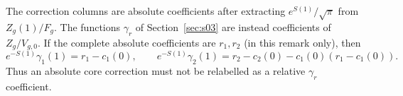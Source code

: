 \begin{rmk}[Normalization]
The correction columns are absolute coefficients after extracting
$e^{S(1)}/\sqrt\pi$ from $Z_g(1)/F_g$. The functions $\gamma_r$ of
Section~\ref{sec:s03} are instead coefficients of $Z_g/V_{g,0}$.
If the complete absolute coefficients are $r_1,r_2$ (in this remark
only), then
\[
 e^{-S(1)}\gamma_1(1)=r_1-c_1(0),\qquad
 e^{-S(1)}\gamma_2(1)=r_2-c_2(0)-c_1(0)(r_1-c_1(0)).
\]
Thus an absolute core correction must not be relabelled as a relative
$\gamma_r$ coefficient.
\end{rmk}

